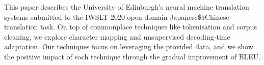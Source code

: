 This paper describes the University of Edinburgh's neural machine translation systems submitted to the IWSLT 2020 open domain Japanese\$\leftrightarrow\$Chinese translation task. On top of commonplace techniques like tokenisation and corpus cleaning, we explore character mapping and unsupervised decoding-time adaptation. Our techniques focus on leveraging the provided data, and we show the positive impact of each technique through the gradual improvement of BLEU.
